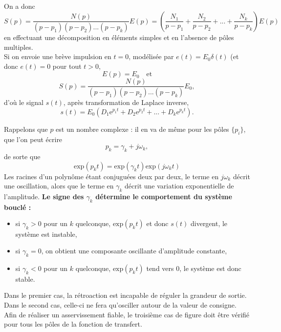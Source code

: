 \documentclass[11pt,a4paper]{report}
\begin{document}
On a donc
\begin{equation}
	S(p) = \frac{N(p)}{(p-p_1)(p-p_2)...(p - p_k)} E(p) = \left( \frac{N_1}{p-p_1} + \frac{N_2}{p-p_2} + ... + \frac{N_k}{p-p_k}\right) E(p)
\end{equation}
en effectuant une décomposition en éléments simples et en l'absence de pôles multiples.\\

Si on envoie une brève impulsion en $t = 0$, modélisée par $e(t) = E_0\delta(t)$ (et donc $e(t) = 0$ pour tout $t > 0$,
\begin{equation}
	E(p) = E_0 \quad\text{et}
\end{equation}
\begin{equation}
	S(p) = \frac{N(p)}{(p-p_1)(p-p_2)...(p - p_k)} E_0,
\end{equation}
d'où le signal $s(t)$, après transformation de Laplace inverse,
\begin{equation}
	\boxed{s(t) = E_0 \left(D_1 \text{e}^{p_1 t} + D_2 \text{e}^{p_2 t} + ... + D_k \text{e}^{p_k t}  \right)}.
\end{equation}

Rappelons que $p$ est un nombre complexe : il en va de même pour les pôles $\{p_i\}$, que l'on peut écrire
\begin{equation}
	p_k = \gamma_k + j \omega_k,
\end{equation}
de sorte que
\begin{equation}
	\text{exp}\left(p_k t\right) = \text{exp}\left(\gamma_k t\right) \text{exp}\left(j \omega_k t\right)
\end{equation}
Les racines d'un polynôme étant conjuguées deux par deux, le terme en $j\omega_k$ décrit une oscillation, alors que le terme en $\gamma_k$ décrit une variation exponentielle de l'amplitude. \textbf{Le signe des $\gamma_k$ détermine le comportement du système bouclé :}
\begin{itemize}
\item  si $\gamma_k > 0$ pour un $k$ quelconque, $\text{exp}(p_k t)$ et donc $s(t)$ divergent, le système est instable,
\item  si $\gamma_k = 0$, on obtient une composante oscillante d'amplitude constante,
\item  si $\gamma_k < 0$ pour un $k$ quelconque, $\text{exp}(p_k t)$ tend vers 0, le système est donc stable. 
\end{itemize}
Dans le premier cas, la rétroaction est incapable de réguler la grandeur de sortie. Dans le second cas, celle-ci ne fera qu'osciller autour de la valeur de consigne. Afin de réaliser un asservissement fiable, le troisième cas de figure doit être vérifié pour tous les pôles de la fonction de transfert.\\
\end{document}
